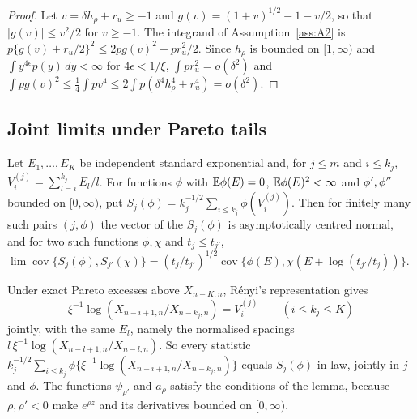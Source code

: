 \begin{proof}
Let $v=\delta h_\rho+r_u\ge-1$ and $g(v)=(1+v)^{1/2}-1-v/2$, so that $|g(v)|\le v^2/2$ for
$v\ge-1$. The integrand of Assumption~\ref{ass:A2} is $p\{g(v)+r_u/2\}^2\le2pg(v)^2+pr_u^2/2$.
Since $h_\rho$ is bounded on $[1,\infty)$ and $\int y^{4\epsilon}p(y)\,dy<\infty$ for
$4\epsilon<1/\xi$, $\int pr_u^2=o(\delta^2)$ and
$\int pg(v)^2\le\frac14\int pv^4\le2\int p(\delta^4h_\rho^4+r_u^4)=o(\delta^2)$. \qedhere
\end{proof}

\subsection{Joint limits under Pareto tails}

\begin{lemma}\label{lem:clt}
Let $E_1,\dots,E_K$ be independent standard exponential and, for $j\le m$ and $i\le k_j$,
$V^{(j)}_i=\sum_{l=i}^{k_j}E_l/l$. For functions $\phi$ with $\mathbb{E}\phi(E)=0$, $\mathbb{E}\phi(E)^2<\infty$ and
$\phi',\phi''$ bounded on $[0,\infty)$, put $S_j(\phi)=k_j^{-1/2}\sum_{i\le k_j}\phi(V^{(j)}_i)$.
Then for finitely many such pairs $(j,\phi)$ the vector of the $S_j(\phi)$ is asymptotically
centred normal, and for two such functions $\phi,\chi$ and $t_j\le t_{j'}$,
$\lim\operatorname{cov}\{S_j(\phi),S_{j'}(\chi)\}=(t_j/t_{j'})^{1/2}\operatorname{cov}\{\phi(E),\chi(E+\log(t_{j'}/t_j))\}$.
\end{lemma}

Under exact Pareto excesses above $X_{n-K,n}$, R\'enyi's representation gives
\[
\xi^{-1}\log(X_{n-i+1,n}/X_{n-k_j,n})=V^{(j)}_i\qquad(i\le k_j\le K)
\]
jointly, with the same $E_l$, namely the normalised spacings $l\,\xi^{-1}\log(X_{n-l+1,n}/X_{n-l,n})$.
So every statistic $k_j^{-1/2}\sum_{i\le k_j}\phi\{\xi^{-1}\log(X_{n-i+1,n}/X_{n-k_j,n})\}$ equals
$S_j(\phi)$ in law, jointly in $j$ and $\phi$. The functions $\psi_{\rho'}$ and $a_\rho$ satisfy the conditions of the
lemma, because $\rho,\rho'<0$ make $e^{\rho z}$ and its derivatives bounded on $[0,\infty)$.

